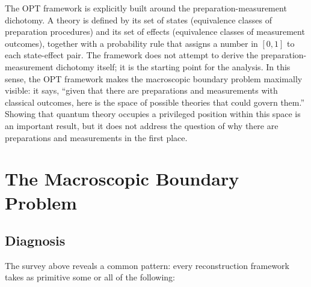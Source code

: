 \documentclass[pdflatex,sn-mathphys-num]{sn-jnl}%
\begin{document}
The OPT framework is explicitly built around the preparation-measurement dichotomy. A theory is defined by its set of states (equivalence classes of preparation procedures) and its set of effects (equivalence classes of measurement outcomes), together with a probability rule that assigns a number in $[0,1]$ to each state-effect pair. The framework does not attempt to derive the preparation-measurement dichotomy itself; it is the starting point for the analysis. In this sense, the OPT framework makes the macroscopic boundary problem maximally visible: it says, ``given that there are preparations and measurements with classical outcomes, here is the space of possible theories that could govern them.'' Showing that quantum theory occupies a privileged position within this space is an important result, but it does not address the question of why there are preparations and measurements in the first place.

\section{The Macroscopic Boundary Problem}\label{sec3}

\subsection{Diagnosis}

The survey above reveals a common pattern: every reconstruction framework takes as primitive some or all of the following:
\end{document}
